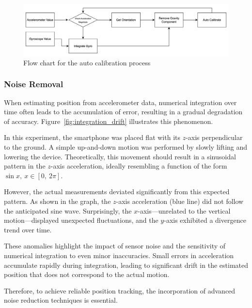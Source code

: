 \documentclass{article}
\begin{document}
    \FloatBarrier
    \begin{figure}[ht]
        \centering
        \includegraphics[width=\textwidth]{auto_calibration_flow_chart.png}
        \caption{Flow chart for the auto calibration process}
        \label{fig:auto_calibration_flow_chart}
    \end{figure}

    \FloatBarrier
    \subsubsection{Noise Removal}
    When estimating position from accelerometer data, numerical integration over
    time often leads to the accumulation of error, resulting in a gradual
    degradation of accuracy. Figure~\ref{fig:integration_drift} illustrates this
    phenomenon.

    In this experiment, the smartphone was placed flat with its $z$-axis
    perpendicular to the ground. A simple up-and-down motion was performed by slowly
    lifting and lowering the device. Theoretically, this movement should result in
    a sinusoidal pattern in the $z$-axis acceleration, ideally resembling a
    function of the form $\sin x,\ x \in [0,\ 2\pi]$.

    However, the actual measurements deviated significantly from this expected pattern.
    As shown in the graph, the $z$-axis acceleration (blue line) did not follow the
    anticipated sine wave. Surprisingly, the $x$-axis—unrelated to the vertical motion—displayed
    unexpected fluctuations, and the $y$-axis exhibited a divergence trend over
    time.

    These anomalies highlight the impact of sensor noise and the sensitivity of
    numerical integration to even minor inaccuracies. Small errors in acceleration
    accumulate rapidly during integration, leading to significant drift in the
    estimated position that does not correspond to the actual motion.

    Therefore, to achieve reliable position tracking, the incorporation of
    advanced noise reduction techniques is essential.
\end{document}
